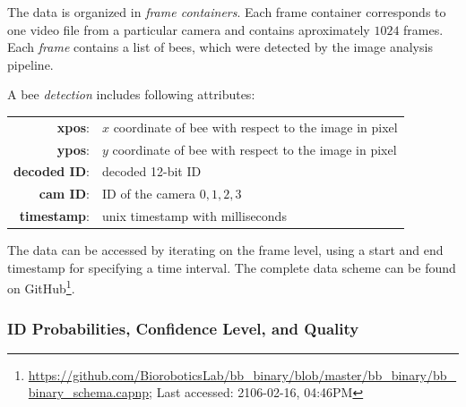 The data is organized in \emph{frame containers}.
Each frame container corresponds to one video file from a particular camera and contains aproximately $1024$ frames.
Each \emph{frame} contains a list of bees, which were detected by the image analysis pipeline.

A bee \emph{detection} includes following attributes:

\begin{table}[!bp]
\small
\centering
\begin{tabular}{rl}
\textbf{xpos}: & $x$ coordinate of bee with respect to the image in pixel \vspace{2mm}\\
\textbf{ypos}: & $y$ coordinate of bee with respect to the image in pixel \vspace{2mm}\\
\textbf{decoded ID}: & decoded 12-bit ID \vspace{2mm}\\
\textbf{cam ID}: & ID of the camera ${0,1,2,3}$ \vspace{2mm}\\
\textbf{timestamp}: & unix timestamp with milliseconds\\
\end{tabular}
\end{table}

The data can be accessed by iterating on the frame level, using a start and end time\-stamp for specifying a time interval. The complete data scheme can be found on GitHub\footnote{\url{https://github.com/BioroboticsLab/bb_binary/blob/master/bb_binary/bb_binary_schema.capnp}; Last accessed: 2106-02-16, 04:46PM}. 


\subsubsection{ID Probabilities, Confidence Level, and Quality}
\label{subsec:confidence}

